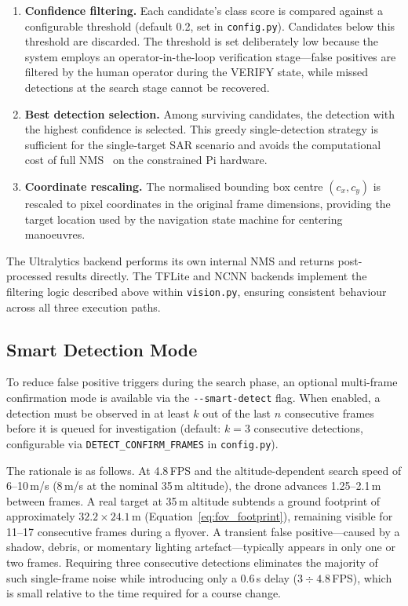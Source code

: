 \begin{enumerate}
    \item \textbf{Confidence filtering.} Each candidate's class score is compared against a configurable threshold (default 0.2, set in \texttt{config.py}). Candidates below this threshold are discarded. The threshold is set deliberately low because the system employs an operator-in-the-loop verification stage---false positives are filtered by the human operator during the VERIFY state, while missed detections at the search stage cannot be recovered.

    \item \textbf{Best detection selection.} Among surviving candidates, the detection with the highest confidence is selected. This greedy single-detection strategy is sufficient for the single-target SAR scenario and avoids the computational cost of full NMS~\cite{nms} on the constrained Pi hardware.

    \item \textbf{Coordinate rescaling.} The normalised bounding box centre $(c_x, c_y)$ is rescaled to pixel coordinates in the original frame dimensions, providing the target location used by the navigation state machine for centering manoeuvres.
\end{enumerate}

The Ultralytics backend performs its own internal NMS and returns post-processed results directly. The TFLite and NCNN backends implement the filtering logic described above within \texttt{vision.py}, ensuring consistent behaviour across all three execution paths.

\subsection{Smart Detection Mode}\label{sec:cv:smartdetect}

To reduce false positive triggers during the search phase, an optional multi-frame confirmation mode is available via the \texttt{-{}-smart-detect} flag. When enabled, a detection must be observed in at least $k$ out of the last $n$ consecutive frames before it is queued for investigation (default: $k=3$ consecutive detections, configurable via \texttt{DETECT\_CONFIRM\_FRAMES} in \texttt{config.py}).

The rationale is as follows. At 4.8\,FPS and the altitude-dependent search speed of 6--10\,m/s (8\,m/s at the nominal 35\,m altitude), the drone advances 1.25--2.1\,m between frames. A real target at 35\,m altitude subtends a ground footprint of approximately $32.2\times24.1$\,m (Equation~\ref{eq:fov_footprint}), remaining visible for 11--17 consecutive frames during a flyover. A transient false positive---caused by a shadow, debris, or momentary lighting artefact---typically appears in only one or two frames. Requiring three consecutive detections eliminates the majority of such single-frame noise while introducing only a 0.6\,s delay ($3 \div 4.8$\,FPS), which is small relative to the time required for a course change.


